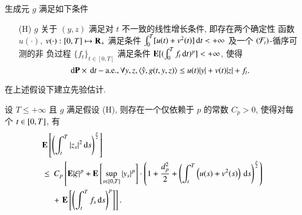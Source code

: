 生成元 $g$ 满足如下条件
\begin{itemize}
  \item[(H)] $g$ 关于 $(y,z)$ 满足对 $t$ 不一致的线性增长条件, 即存在两个确定性
             函数 $u(\cdot)$, $v(\cdot):[0,T]\mapsto\mathrm{\mathbf{R}}_+$ 满足条件
              $\int^{T}_{0}[u(t)+v^2(t)]\,\mathrm{d} t<+\infty$ 及一个 $(\mathcal{F}_t)$-循序可测的非
             负过程 $\{f_t\}_{t\in[0,T]}$ 满足条件 $\mathrm{\mathbf{E}}[(\int^T_0 f_t\,\mathrm{d} t)^p]<+\infty$,
             使得
             $$\,\mathrm{d}\mathrm{\mathbf{P}}\times\,\mathrm{d} t-\mathrm{a.e.},\forall y,z, \langle\hat{y},g(t,y,z)\rangle\leq u(t)|y|+v(t)|z|+f_t.$$
\end{itemize}

在上述假设下建立先验估计.

\begin{lemma}\label{lemma:i}
  设 $T\leq+\infty$ 且 $g$ 满足假设 (H), 则存在一个仅依赖于 $p$ 的常数 $C_p>0$,
  使得对每个 $t\in[0,T]$, 有
  \begin{align}
    & \mathrm{\mathbf{E}}\left[
          \left(
             \int^T_t|z_s|^2\,\mathrm{d} s
          \right)^{p\over 2}
       \right]\nonumber\\
    & \leq \ C_p
       \left[
          \mathrm{\mathbf{E}}|\xi|^p+\mathrm{\mathbf{E}}
          \left[
             \sup_{s\in[0,T]}|y_s|^p
          \right]\cdot
             \left(
                1+\frac{d^2_p}{2}+
                  \left(
                     \int^T_t\left(u(s)+v^2(s)\right)\,\mathrm{d} s
                  \right)^{p\over 2}
             \right)
       \right.\nonumber\\
    &\quad\ +\left.\mathrm{\mathbf{E}}
            \left[
               \left(\int^T_t f_s\,\mathrm{d} s\right)^p
            \right]
         \right].
  \end{align}
\end{lemma}
